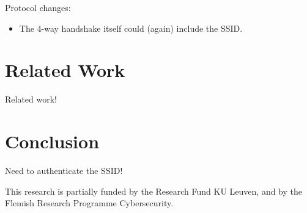 \documentclass[sigconf,review]{acmart}
\begin{document}
Protocol changes:
\begin{itemize}
	\item The 4-way handshake itself could (again) include the SSID.
\end{itemize}

\section{Related Work}
\label{sec:relatedwork}

Related work!

\section{Conclusion}
\label{sec:conclusion}

Need to authenticate the SSID!

\begin{acks}
This research is partially funded by the Research Fund KU Leuven, and by the Flemish Research Programme Cybersecurity.
\end{acks}




\end{document}
